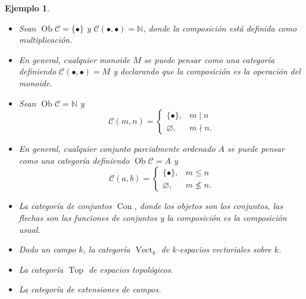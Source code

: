 \documentclass[12pt,letterpaper,titlepage]{article}
\let\emptyset\varnothing
\newtheorem*{exa}{Ejemplo}
\theoremstyle{definition}
\newcommand\N{\mathbb N}
\renewcommand\cal[1]{\mathcal{#1}}
\newcommand\<{\langle}
\renewcommand\>{\rangle}
\DeclareMathOperator{\Con}{Con}
\DeclareMathOperator{\Top}{Top}
\DeclareMathOperator{\Vect}{Vect}
\DeclareMathOperator{\Ob}{Ob}
\begin{document}
\begin{exa}
\begin{itemize}
  \item Sean $\Ob\cal C=\{\bullet\}$ y $\cal
    C(\bullet,\bullet)=\N$, donde la composición está definida
    como multiplicación.
  \item
  En general, cualquier monoide $M$ se puede pensar como una
  categoría definiendo $\cal C(\bullet,\bullet)=M$
  y declarando que la composición es la operación del monoide.
  \item Sean $\Ob\cal C=\N$ y
    \[
      \cal C(m,n) =
      \begin{cases}
        \{\bullet\}, & m\mid n \\
        \emptyset, & m\nmid n.
      \end{cases}
    \]
  \item
  En general, cualquier conjunto parcialmente ordenado $A$
  se puede pensar como una categoría definiendo $\Ob\cal C=A$
  y
    \[
      \cal C(a,b) =
      \begin{cases}
        \{\bullet\}, & m\leq n \\
        \emptyset, & m\nleq n.
      \end{cases}
    \]
  \item La categoría de conjuntos $\Con$, donde los objetos
  son los conjuntos, las flechas son las funciones de conjuntos
  y la composición es la composición usual.
  \item Dado un campo $k$, la categoría $\Vect_k$ de $k$-espacios
    vectoriales sobre $k$.
  \item La categoría $\Top$ de espacios topológicos.
  \item La categoría de extensiones de campos.
 \end{itemize}
\end{exa}
\end{document}
